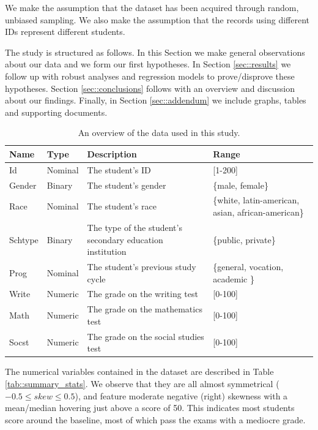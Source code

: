 \documentclass[10pt]{article}
\begin{document}
	We make the assumption that the dataset has been acquired through random, unbiased sampling. We also make the assumption that the records using different IDs represent different students.
	
	The study is structured as follows. In this Section we make general observations about our data and we form our first hypotheses. In Section \ref{sec::results} we follow up with robust analyses and regression models to prove/disprove these hypotheses. Section \ref{sec::conclusions} follows with an overview and discussion about our findings. Finally, in Section \ref{sec::addendum} we include graphs, tables and supporting documents.
	
	\begin{table}
		\centering
		\begin{tabular}
			{ |p{1cm} p{1cm} p{5cm} p{3cm}| }
			\hline
			\textbf{Name} & \textbf{Type} & \textbf{Description} & \textbf{Range}\\
			\hline
			Id  & Nominal & The student's ID & [1-200] \\
			Gender  & Binary & The student's gender & \{male, female\} \\
			Race  & Nominal & The student's race & \{white, latin-american, asian, african-american\} \\
			Schtype  & Binary & The type of the student's secondary education institution & \{public, private\} \\
			Prog  & Nominal & The student's previous study cycle  & \{general, vocation, academic \} \\
			Write  & Numeric & The grade on the writing test  & [0-100] \\
			Math  & Numeric & The grade on the mathematics test  & [0-100] \\
			Socst  & Numeric & The grade on the social studies test & [0-100] \\
			\hline
		\end{tabular}
		\caption{An overview of the data used in this study.}
		\label{tab::dataset}
	\end{table}


	The numerical variables contained in the dataset are described in Table \ref{tab::summary_stats}. We observe that they are all almost symmetrical ($-0.5 \leq skew \leq 0.5$), and feature moderate negative (right) skewness with a mean/median hovering just above a score of 50. This indicates most students score around the baseline, most of which pass the exams with a mediocre grade.
\end{document}
